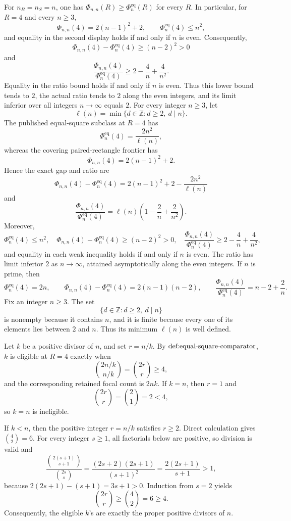 For \(n_B=n_S=n\), one has \(\Phi_{n,n}(R)\ge \Phi_n^{\mathrm{eq}}(R)\) for every \(R\). In particular, for \(R=4\) and every \(n\ge3\),
\[
\Phi_{n,n}(4)=2(n-1)^2+2,
\qquad
\Phi_n^{\mathrm{eq}}(4)\le n^2,
\]
and equality in the second display holds if and only if \(n\) is even. Consequently,
\[
\Phi_{n,n}(4)-\Phi_n^{\mathrm{eq}}(4)\ge (n-2)^2>0
\]
and
\[
\frac{\Phi_{n,n}(4)}{\Phi_n^{\mathrm{eq}}(4)}
\ge 2-\frac4n+\frac4{n^2}.
\]
Equality in the ratio bound holds if and only if \(n\) is even. Thus this lower bound tends to \(2\), the actual ratio tends to \(2\) along the even integers, and its limit inferior over all integers \(n\to\infty\) equals \(2\).
For every integer \(n\ge3\), let
\[
\ell(n)=\min\{d\in\mathbb Z:d\ge2,\ d\mid n\}.
\]
The published equal-square subclass at \(R=4\) has
\[
\Phi_n^{\mathrm{eq}}(4)=\frac{2n^2}{\ell(n)},
\]
whereas the covering paired-rectangle frontier has
\[
\Phi_{n,n}(4)=2(n-1)^2+2.
\]
Hence the exact gap and ratio are
\[
\Phi_{n,n}(4)-\Phi_n^{\mathrm{eq}}(4)
=2(n-1)^2+2-\frac{2n^2}{\ell(n)}
\]
and
\[
\frac{\Phi_{n,n}(4)}{\Phi_n^{\mathrm{eq}}(4)}
=\ell(n)\left(1-\frac2n+\frac{2}{n^2}\right).
\]
Moreover,
\[
\Phi_n^{\mathrm{eq}}(4)\le n^2,
\quad
\Phi_{n,n}(4)-\Phi_n^{\mathrm{eq}}(4)\ge(n-2)^2>0,
\quad
\frac{\Phi_{n,n}(4)}{\Phi_n^{\mathrm{eq}}(4)}
\ge2-\frac4n+\frac4{n^2},
\]
and equality in each weak inequality holds if and only if \(n\) is even. The ratio has limit inferior \(2\) as \(n\to\infty\), attained asymptotically along the even integers. If \(n\) is prime, then
\[
\Phi_n^{\mathrm{eq}}(4)=2n,
\qquad
\Phi_{n,n}(4)-\Phi_n^{\mathrm{eq}}(4)=2(n-1)(n-2),
\qquad
\frac{\Phi_{n,n}(4)}{\Phi_n^{\mathrm{eq}}(4)}=n-2+\frac2n.
\]
Fix an integer \(n\ge3\). The set
\[
\{d\in\mathbb Z:d\ge2,\ d\mid n\}
\]
is nonempty because it contains \(n\), and it is finite because every one of its elements lies between \(2\) and \(n\). Thus its minimum \(\ell(n)\) is well defined.

Let \(k\) be a positive divisor of \(n\), and set \(r=n/k\). By \(\textnormal{def:equal-square-comparator}\), \(k\) is eligible at \(R=4\) exactly when
\[
\binom{2n/k}{n/k}=\binom{2r}{r}\ge4,
\]
and the corresponding retained focal count is \(2nk\). If \(k=n\), then \(r=1\) and
\[
\binom{2r}{r}=\binom21=2<4,
\]
so \(k=n\) is ineligible.

If \(k<n\), then the positive integer \(r=n/k\) satisfies \(r\ge2\). Direct calculation gives \(\binom42=6\). For every integer \(s\ge1\), all factorials below are positive, so division is valid and
\[
\frac{\binom{2(s+1)}{s+1}}{\binom{2s}{s}}
=\frac{(2s+2)(2s+1)}{(s+1)^2}
=\frac{2(2s+1)}{s+1}>1,
\]
because \(2(2s+1)-(s+1)=3s+1>0\). Induction from \(s=2\) yields
\[
\binom{2r}{r}\ge\binom42=6\ge4.
\]
Consequently, the eligible \(k\)'s are exactly the proper positive divisors of \(n\).

